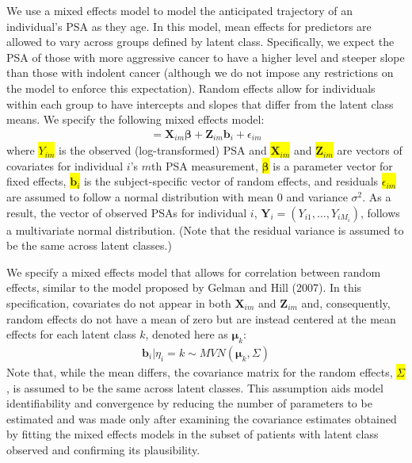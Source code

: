 \documentclass[12pt, letterpaper]{article}
\newcommand{\bmbeta}{\boldsymbol{\beta}}
\newcommand{\bmmu}{\boldsymbol{\mu}}
\newcommand{\bmY}{\mathbf{Y}}
\newcommand{\bmZ}{\mathbf{Z}}
\newcommand{\bmX}{\mathbf{X}}
\newcommand{\bmb}{\mathbf{b}}
\newcommand{\beas}{\begin{eqnarray*}}
\newcommand{\eeas}{\end{eqnarray*}}
\newcommand{\highlight}[1]{\colorbox{yellow}{#1}}
\begin{document}
We use a mixed effects model to model the anticipated trajectory of an individual's PSA as they age. In this model, mean effects for predictors are allowed to vary across groups defined by latent class. Specifically, we expect the PSA of those with more aggressive cancer to have a higher level and steeper slope than those with indolent cancer (although we do not impose any restrictions on the model to enforce this expectation).  Random effects allow for individuals within each group to have intercepts and slopes that differ from the latent class means. We specify the following mixed effects model: 
\beas
[\,Y_{im} | \eta_i=k, \bmX_{im}, \bmZ_{im}\,] = \bmX_{im}\bmbeta + \bmZ_{im}\bmb_i + \epsilon_{im}
\eeas
where \highlight{$Y_{im}$} is the observed (log-transformed) PSA and \highlight{$\bmX_{im}$} and \highlight{$\bmZ_{im}$} are vectors of covariates for individual $i$'s $m$th PSA measurement, \highlight{$\bmbeta$} is a parameter vector for fixed effects, \highlight{$\bmb_i$} is the subject-specific vector of random effects, and residuals \highlight{$\epsilon_{im}$} are assumed to follow a normal distribution with mean 0 and variance $\sigma^2$. As a result, the vector of observed PSAs for individual $i$, $\bmY_i=(Y_{i1},\dots,Y_{iM_i})$, follows a multivariate normal distribution. (Note that the residual variance is assumed to be the same across latent classes.)

We specify a mixed effects model that allows for correlation between random effects, similar to the model proposed by Gelman and Hill (2007). In this specification, covariates do not appear in both $\bmX_{im}$ and $\bmZ_{im}$ and, consequently, random effects do not have a mean of zero but are instead centered at the mean effects for each latent class $k$, denoted here as $\bmmu_k$:
\beas
\bmb_i | \eta_i=k \sim MVN ( \bmmu_k, \Sigma) 
\eeas
Note that, while the mean differs, the covariance matrix for the random effects, \highlight{$\Sigma$}, is assumed to be the same across latent classes. This assumption aids model identifiability and convergence by reducing the number of parameters to be estimated and was made only after examining the covariance estimates obtained by fitting the mixed effects models in the subset of patients with latent class observed and confirming its plausibility. 

\end{document}
